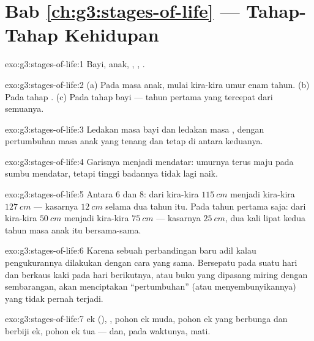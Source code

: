 \section*{Bab \ref{ch:g3:stages-of-life} --- Tahap-Tahap Kehidupan}

\begin{solution}{exo:g3:stages-of-life:1}
Bayi, anak, , , .
\end{solution}

\begin{solution}{exo:g3:stages-of-life:2}
(a) Pada masa anak, mulai kira-kira umur enam tahun. (b) Pada tahap
. (c) Pada tahap bayi --- tahun pertama yang tercepat dari
semuanya.
\end{solution}

\begin{solution}{exo:g3:stages-of-life:3}
Ledakan masa bayi dan ledakan masa , dengan pertumbuhan masa
anak yang tenang dan tetap di antara keduanya.
\end{solution}

\begin{solution}{exo:g3:stages-of-life:4}
Garisnya menjadi mendatar: umurnya terus maju pada sumbu mendatar,
tetapi tinggi badannya tidak lagi naik.
\end{solution}

\begin{solution}{exo:g3:stages-of-life:5}
Antara $6$ dan $8$: dari kira-kira $\qty{115}{cm}$ menjadi kira-kira
$\qty{127}{cm}$ --- kasarnya $\qty{12}{cm}$ selama dua tahun itu. Pada
tahun pertama saja: dari kira-kira $\qty{50}{cm}$ menjadi kira-kira
$\qty{75}{cm}$ --- kasarnya $\qty{25}{cm}$, dua kali lipat kedua tahun
masa anak itu bersama-sama.
\end{solution}

\begin{solution}{exo:g3:stages-of-life:6}
Karena sebuah perbandingan baru adil kalau pengukurannya dilakukan
dengan cara yang sama. Bersepatu pada suatu hari dan berkaus kaki pada
hari berikutnya, atau buku yang dipasang miring dengan sembarangan,
akan menciptakan ``pertumbuhan'' (atau menyembunyikannya) yang tidak
pernah terjadi.
\end{solution}

\begin{solution}{exo:g3:stages-of-life:7}
 ek (), , pohon ek muda, pohon ek  yang berbunga
dan berbiji ek, pohon ek tua --- dan, pada waktunya, mati.
\end{solution}

